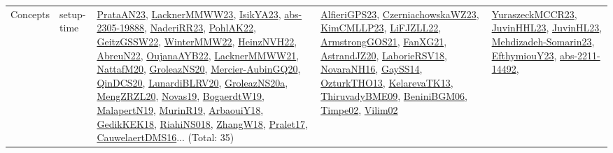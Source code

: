 {\begin{longtable}{lp{3cm}>{\raggedright}p{6cm}>{\raggedright}p{6cm}p{8cm}}
Concepts & setup-time & \href{articles/PrataAN23.pdf}{PrataAN23}\cite{PrataAN23}, \href{articles/LacknerMMWW23.pdf}{LacknerMMWW23}\cite{LacknerMMWW23}, \href{articles/IsikYA23.pdf}{IsikYA23}\cite{IsikYA23}, \href{articles/abs-2305-19888.pdf}{abs-2305-19888}\cite{abs-2305-19888}, \href{articles/NaderiRR23.pdf}{NaderiRR23}\cite{NaderiRR23}, \href{articles/PohlAK22.pdf}{PohlAK22}\cite{PohlAK22}, \href{papers/GeitzGSSW22.pdf}{GeitzGSSW22}\cite{GeitzGSSW22}, \href{papers/WinterMMW22.pdf}{WinterMMW22}\cite{WinterMMW22}, \href{articles/HeinzNVH22.pdf}{HeinzNVH22}\cite{HeinzNVH22}, \href{articles/AbreuN22.pdf}{AbreuN22}\cite{AbreuN22}, \href{papers/OujanaAYB22.pdf}{OujanaAYB22}\cite{OujanaAYB22}, \href{papers/LacknerMMWW21.pdf}{LacknerMMWW21}\cite{LacknerMMWW21}, \href{papers/NattafM20.pdf}{NattafM20}\cite{NattafM20}, \href{papers/GroleazNS20.pdf}{GroleazNS20}\cite{GroleazNS20}, \href{papers/Mercier-AubinGQ20.pdf}{Mercier-AubinGQ20}\cite{Mercier-AubinGQ20}, \href{articles/QinDCS20.pdf}{QinDCS20}\cite{QinDCS20}, \href{articles/LunardiBLRV20.pdf}{LunardiBLRV20}\cite{LunardiBLRV20}, \href{papers/GroleazNS20a.pdf}{GroleazNS20a}\cite{GroleazNS20a}, \href{articles/MengZRZL20.pdf}{MengZRZL20}\cite{MengZRZL20}, \href{articles/Novas19.pdf}{Novas19}\cite{Novas19}, \href{papers/BogaerdtW19.pdf}{BogaerdtW19}\cite{BogaerdtW19}, \href{papers/MalapertN19.pdf}{MalapertN19}\cite{MalapertN19}, \href{papers/MurinR19.pdf}{MurinR19}\cite{MurinR19}, \href{papers/ArbaouiY18.pdf}{ArbaouiY18}\cite{ArbaouiY18}, \href{articles/GedikKEK18.pdf}{GedikKEK18}\cite{GedikKEK18}, \href{papers/RiahiNS018.pdf}{RiahiNS018}\cite{RiahiNS018}, \href{articles/ZhangW18.pdf}{ZhangW18}\cite{ZhangW18}, \href{papers/Pralet17.pdf}{Pralet17}\cite{Pralet17}, \href{papers/CauwelaertDMS16.pdf}{CauwelaertDMS16}\cite{CauwelaertDMS16}... (Total: 35) & \href{articles/AlfieriGPS23.pdf}{AlfieriGPS23}\cite{AlfieriGPS23}, \href{articles/CzerniachowskaWZ23.pdf}{CzerniachowskaWZ23}\cite{CzerniachowskaWZ23}, \href{papers/KimCMLLP23.pdf}{KimCMLLP23}\cite{KimCMLLP23}, \href{papers/LiFJZLL22.pdf}{LiFJZLL22}\cite{LiFJZLL22}, \href{papers/ArmstrongGOS21.pdf}{ArmstrongGOS21}\cite{ArmstrongGOS21}, \href{articles/FanXG21.pdf}{FanXG21}\cite{FanXG21}, \href{articles/AstrandJZ20.pdf}{AstrandJZ20}\cite{AstrandJZ20}, \href{articles/LaborieRSV18.pdf}{LaborieRSV18}\cite{LaborieRSV18}, \href{articles/NovaraNH16.pdf}{NovaraNH16}\cite{NovaraNH16}, \href{papers/GaySS14.pdf}{GaySS14}\cite{GaySS14}, \href{articles/OzturkTHO13.pdf}{OzturkTHO13}\cite{OzturkTHO13}, \href{papers/KelarevaTK13.pdf}{KelarevaTK13}\cite{KelarevaTK13}, \href{papers/ThiruvadyBME09.pdf}{ThiruvadyBME09}\cite{ThiruvadyBME09}, \href{papers/BeniniBGM06.pdf}{BeniniBGM06}\cite{BeniniBGM06}, \href{articles/Timpe02.pdf}{Timpe02}\cite{Timpe02}, \href{papers/Vilim02.pdf}{Vilim02}\cite{Vilim02} & \href{articles/YuraszeckMCCR23.pdf}{YuraszeckMCCR23}\cite{YuraszeckMCCR23}, \href{papers/JuvinHHL23.pdf}{JuvinHHL23}\cite{JuvinHHL23}, \href{papers/JuvinHL23.pdf}{JuvinHL23}\cite{JuvinHL23}, \href{papers/Mehdizadeh-Somarin23.pdf}{Mehdizadeh-Somarin23}\cite{Mehdizadeh-Somarin23}, \href{papers/EfthymiouY23.pdf}{EfthymiouY23}\cite{EfthymiouY23}, \href{articles/abs-2211-14492.pdf}{abs-2211-14492}\cite{abs-2211-14492}, 
\end{longtable}}
